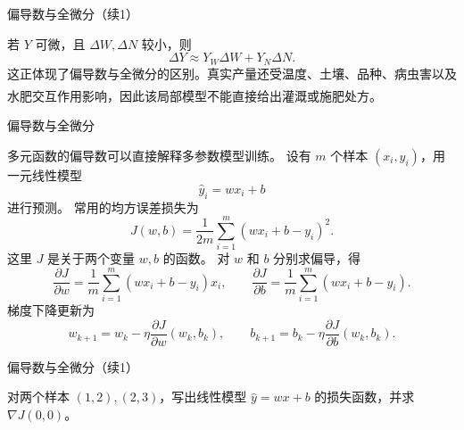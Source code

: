 \documentclass[aspectratio=169,10pt,fontset=fandol]{ctexbeamer}
\newcommand{\upcite}[1]{\textsuperscript{\textsuperscript{\cite{#1}}}}
\begin{document}
\begin{frame}[t,fragile]{偏导数与全微分（续1）}
\normalsize
{\normalsize
\begin{application}[作物产量对水分和氮肥的敏感性]
若 $Y$ 可微，且 $\Delta W,\Delta N$ 较小，则
\[
\Delta Y\approx Y_W\Delta W+Y_N\Delta N.
\]
这正体现了偏导数与全微分的区别。真实产量还受温度、土壤、品种、病虫害以及水肥交互作用影响，因此该局部模型不能直接给出灌溉或施肥处方。\upcite{TaizPlant}
\end{application}
}
\end{frame}
\begin{frame}[t,fragile]{偏导数与全微分}
\footnotesize
{\footnotesize
\begin{application}[偏导数在多参数机器学习模型中的应用]
	
	多元函数的偏导数可以直接解释多参数模型训练。 设有 $m$ 个样本 $(x_i,y_i)$，用一元线性模型
	\[
	\hat y_i=wx_i+b
	\]
	进行预测。 常用的均方误差损失为
	\[
	J(w,b)=\frac{1}{2m}\sum_{i=1}^{m}(wx_i+b-y_i)^2.
	\]
	这里 $J$ 是关于两个变量 $w,b$ 的函数。 对 $w$ 和 $b$ 分别求偏导，得
	\[
	\frac{\partial J}{\partial w}
	=\frac{1}{m}\sum_{i=1}^{m}(wx_i+b-y_i)x_i,
	\qquad
	\frac{\partial J}{\partial b}
	=\frac{1}{m}\sum_{i=1}^{m}(wx_i+b-y_i).
	\]
	梯度下降更新为
	\[
	w_{k+1}=w_k-\eta\frac{\partial J}{\partial w}(w_k,b_k),\qquad
	b_{k+1}=b_k-\eta\frac{\partial J}{\partial b}(w_k,b_k).
	\]
	

\end{application}
}
\end{frame}
\begin{frame}[t,fragile]{偏导数与全微分（续1）}
\normalsize
{\normalsize
\begin{application}[偏导数在多参数机器学习模型中的应用]
	\begin{example}
		对两个样本 $(1,2),(2,3)$，写出线性模型 $\hat y=wx+b$ 的损失函数，并求 $\nabla J(0,0)$。
	\end{example}
\end{application}
}
\end{frame}
\end{document}
